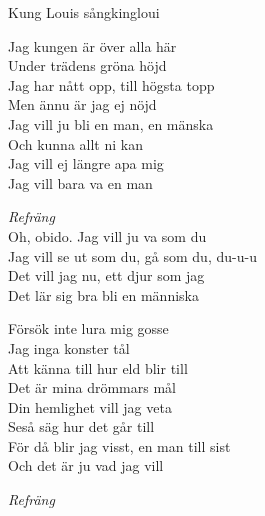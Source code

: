 \begin{song}{Kung Louis sång}{kingloui}
\begin{vers}
Jag kungen är över alla här\\
Under trädens gröna höjd\\
Jag har nått opp, till högsta topp\\
Men ännu är jag ej nöjd\\
Jag vill ju bli en man, en mänska\\
Och kunna allt ni kan\\
Jag vill ej längre apa mig\\
Jag vill bara va en man\\
\end{vers}
\begin{vers}
\textit{Refräng}\\
Oh, obido. Jag vill ju va som du\\
Jag vill se ut som du, gå som du, du-u-u\\
Det vill jag nu, ett djur som jag\\
Det lär sig bra bli en människa\\
\end{vers}
\begin{vers}
Försök inte lura mig gosse\\
Jag inga konster tål\\
Att känna till hur eld blir till\\
Det är mina drömmars mål\\
Din hemlighet vill jag veta\\
Seså säg hur det går till\\
För då blir jag visst, en man till sist\\
Och det är ju vad jag vill\\
\end{vers}
\begin{vers}
\textit{Refräng}\\
\end{vers}
\end{song}
